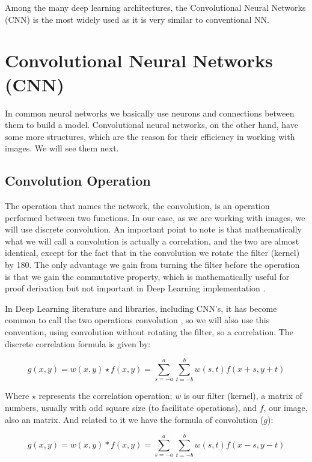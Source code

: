 Among the many deep learning architectures, the Convolutional Neural Networks (CNN) is the most widely used as it is very similar to conventional NN.

\section{Convolutional Neural Networks (CNN)}

In common neural networks we basically use neurons and connections between them to build a model. Convolutional neural networks, on the other hand, have some more structures, which are the reason for their efficiency in working with images. We will see them next.


\subsection{Convolution Operation}

The operation that names the network, the convolution, is an operation performed between two functions. In our case, as we are working with images, we will use discrete convolution.
An important point to note is that mathematically what we will call a convolution is actually a correlation, and the two are almost identical, except for the fact that in the convolution we rotate the filter (kernel) by 180\textdegree . The only advantage we gain from turning the filter before the operation is that we gain the commutative property, which is mathematically useful for proof derivation but not important in Deep Learning  implementation \cite{goodfellow2016}.

In Deep Learning  literature and libraries, including CNN's, it has become common to call the two operations convolution \cite{goodfellow2016}, so we will also use this convention, using convolution without rotating the filter, so a correlation.
The discrete correlation formula is given by:

\begin{equation}
g(x,y)=w(x,y)\star f(x,y)=\sum_{s=-a}^a\sum_{t=-b}^bw(s,t)f(x+s,y+t)
\end{equation}

Where $\star$ represents the correlation operation; $w$ is our filter (kernel), a matrix of numbers, usually with odd square size (to facilitate operations), and $f$, our image, also an matrix. And related to it we have the formula of convolution ($g$):

\begin{equation}
g(x,y)=w(x,y)\ast f(x,y)=\sum_{s=-a}^a\sum_{t=-b}^bw(s,t)f(x-s,y-t)
\end{equation}

